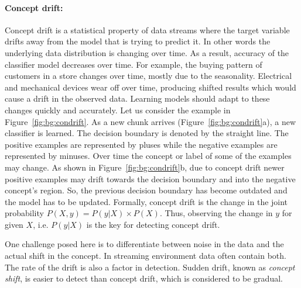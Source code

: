 \paragraph{Concept drift:}
Concept drift is a statistical property of data streams where the target variable drifts away from the model that is trying to predict it. In other words the underlying data distribution is changing over time. As a result, accuracy of the classifier model decreases over time. For example, the buying pattern of customers in a store changes over time, mostly due to the seasonality. Electrical and mechanical devices wear off over time, producing shifted results which would cause a drift in the observed data. Learning models should adapt to these changes quickly and accurately. Let us consider the example in Figure~\ref{fig:bg:condrift}. As a new chunk arrives (Figure~\ref{fig:bg:condrift}a), a new classifier is learned. The decision boundary is denoted by the straight line. The positive examples are represented by pluses while the negative examples are represented by minuses. Over time the concept or label of some of the examples may change. As shown in Figure~\ref{fig:bg:condrift}b, due to concept drift newer positive examples may drift towards the decision boundary and into the negative concept's region. So, the previous decision boundary has become outdated and the model has to be updated. Formally, concept drift is the change in the joint probability \(P(X, y) = P(y|X) \times P(X)\). Thus, observing the change in $y$ for given $X$, i.e. $P(y|X)$ is the key for detecting concept drift.

One challenge posed here is to differentiate between noise in the data and the actual shift in the concept. In streaming environment data often contain both. The rate of the drift is also a factor in detection. Sudden drift, known as {\it concept shift}, is easier to detect than concept drift, which is considered to be gradual.

